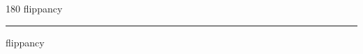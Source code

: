 
\begin{frame}
\begin{center}
\begin{turn}{180}
{\fontsize{2.5cm}{1em}\selectfont flippancy}
\end{turn}
\vspace{1em}\par  
\hrule
\vspace{1em}\par  
{\fontsize{2.5cm}{1em}\selectfont flippancy}
\end{center}
\end{frame}
